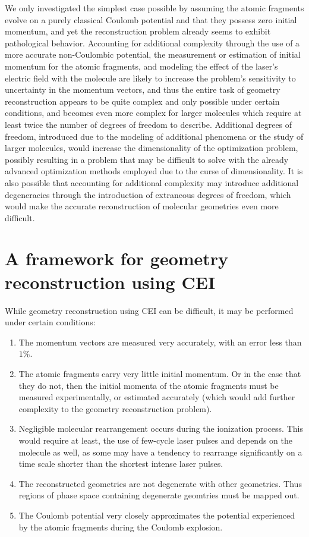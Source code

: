 We only investigated the simplest case possible by assuming the atomic fragments evolve on a purely classical Coulomb potential and that they possess zero initial momentum, and yet the reconstruction problem already seems to exhibit pathological behavior. Accounting for additional complexity through the use of a more accurate non-Coulombic potential, the measurement or estimation of initial momentum for the atomic fragments, and modeling the effect of the laser's electric field with the molecule are likely to increase the problem's sensitivity to uncertainty in the momentum vectors, and thus the entire task of geometry reconstruction appears to be quite complex and only possible under certain conditions, and becomes even more complex for larger molecules which require at least twice the number of degrees of freedom to describe. Additional degrees of freedom, introduced due to the modeling of additional phenomena or the study of larger molecules, would increase the dimensionality of the optimization problem, possibly resulting in a problem that may be difficult to solve with the already advanced optimization methods employed due to the curse of dimensionality. It is also possible that accounting for additional complexity may introduce additional degeneracies through the introduction of extraneous degrees of freedom, which would make the accurate reconstruction of molecular geometries even more difficult.

\section{A framework for geometry reconstruction using CEI}
While geometry reconstruction using CEI can be difficult, it may be performed under certain conditions:
\begin{enumerate}
  \item The momentum vectors are measured very accurately, with an error less than $1\%$.
  \item The atomic fragments carry very little initial momentum. Or in the case that they do not, then the initial momenta of the atomic fragments must be measured experimentally, or estimated accurately (which would add further complexity to the geometry reconstruction problem).
  \item Negligible molecular rearrangement occurs during the ionization process. This would require at least, the use of few-cycle laser pulses and depends on the molecule as well, as some may have a tendency to rearrange significantly on a time scale shorter than the shortest intense laser pulses.
  \item The reconstructed geometries are not degenerate with other geometries. Thus regions of phase space containing degenerate geomtries must be mapped out.
  \item The Coulomb potential very closely approximates the potential experienced by the atomic fragments during the Coulomb explosion.
\end{enumerate}

